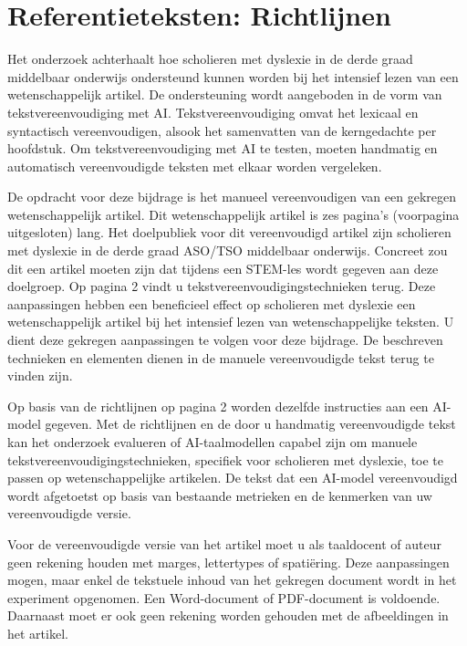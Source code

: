 \chapter{Referentieteksten: Richtlijnen}
\label{ch:referentietekst}
	
Het onderzoek achterhaalt hoe scholieren met dyslexie in de derde graad middelbaar onderwijs ondersteund kunnen worden bij het intensief lezen van een wetenschappelijk artikel. De ondersteuning wordt aangeboden in de vorm van tekstvereenvoudiging met AI. Tekstvereenvoudiging omvat het lexicaal en syntactisch vereenvoudigen, alsook het samenvatten van de kerngedachte per hoofdstuk. Om tekstvereenvoudiging met AI te testen, moeten handmatig en automatisch vereenvoudigde teksten met elkaar worden vergeleken. 
	
	\medspace
	
De opdracht voor deze bijdrage is het manueel vereenvoudigen van een gekregen wetenschappelijk artikel. Dit wetenschappelijk artikel is zes pagina's (voorpagina uitgesloten) lang. Het doelpubliek voor dit vereenvoudigd artikel zijn scholieren met dyslexie in de derde graad ASO/TSO middelbaar onderwijs. Concreet zou dit een artikel moeten zijn dat tijdens een STEM-les wordt gegeven aan deze doelgroep. Op pagina 2 vindt u tekstvereenvoudigingstechnieken terug. Deze aanpassingen hebben een beneficieel effect op scholieren met dyslexie een wetenschappelijk artikel bij het intensief lezen van wetenschappelijke teksten. U dient deze gekregen aanpassingen te volgen voor deze bijdrage. De beschreven technieken en elementen dienen in de manuele vereenvoudigde tekst terug te vinden zijn. 
	
	\medspace
	
Op basis van de richtlijnen op pagina 2 worden dezelfde instructies aan een AI-model gegeven. Met de richtlijnen en de door u handmatig vereenvoudigde tekst kan het onderzoek evalueren of AI-taalmodellen capabel zijn om manuele tekstvereenvoudigingstechnieken, specifiek voor scholieren met dyslexie, toe te passen op wetenschappelijke artikelen. De tekst dat een AI-model vereenvoudigd wordt afgetoetst op basis van bestaande metrieken en de kenmerken van uw vereenvoudigde versie. %
	
	\medspace
	
Voor de vereenvoudigde versie van het artikel moet u als taaldocent of auteur geen rekening houden met marges, lettertypes of spatiëring. Deze aanpassingen mogen, maar enkel de tekstuele inhoud van het gekregen document wordt in het experiment opgenomen. Een Word-document of PDF-document is voldoende. Daarnaast moet er ook geen rekening worden gehouden met de afbeeldingen in het artikel.  
	
